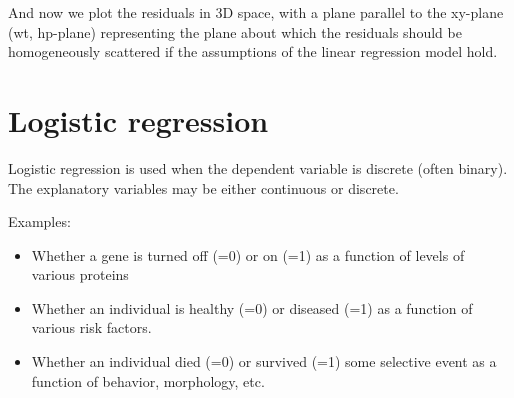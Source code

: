 \documentclass[]{book}
\newenvironment{Shaded}{\begin{snugshade}}{\end{snugshade}}
\newcommand{\CommentTok}[1]{\textcolor[rgb]{0.56,0.35,0.01}{\textit{#1}}}
\newcommand{\DataTypeTok}[1]{\textcolor[rgb]{0.13,0.29,0.53}{#1}}
\newcommand{\DecValTok}[1]{\textcolor[rgb]{0.00,0.00,0.81}{#1}}
\newcommand{\FloatTok}[1]{\textcolor[rgb]{0.00,0.00,0.81}{#1}}
\newcommand{\KeywordTok}[1]{\textcolor[rgb]{0.13,0.29,0.53}{\textbf{#1}}}
\newcommand{\NormalTok}[1]{#1}
\newcommand{\OperatorTok}[1]{\textcolor[rgb]{0.81,0.36,0.00}{\textbf{#1}}}
\newcommand{\StringTok}[1]{\textcolor[rgb]{0.31,0.60,0.02}{#1}}
\providecommand{\tightlist}{%
  \setlength{\itemsep}{0pt}\setlength{\parskip}{0pt}}
\theoremstyle{definition}
\theoremstyle{definition}
\theoremstyle{definition}
\theoremstyle{remark}
\begin{document}
And now we plot the residuals in 3D space, with a plane parallel to the
xy-plane (wt, hp-plane) representing the plane about which the residuals
should be homogeneously scattered if the assumptions of the linear
regression model hold.

\begin{Shaded}
\end{Shaded}

\hypertarget{rgl41290}{}

\hypertarget{logistic-regression}{%
\chapter{Logistic regression}\label{logistic-regression}}

Logistic regression is used when the dependent variable is discrete
(often binary). The explanatory variables may be either continuous or
discrete.

Examples:

\begin{itemize}
\tightlist
\item
  Whether a gene is turned off (=0) or on (=1) as a function of levels
  of various proteins
\item
  Whether an individual is healthy (=0) or diseased (=1) as a function
  of various risk factors.
\item
  Whether an individual died (=0) or survived (=1) some selective event
  as a function of behavior, morphology, etc.
\end{itemize}
\end{document}
